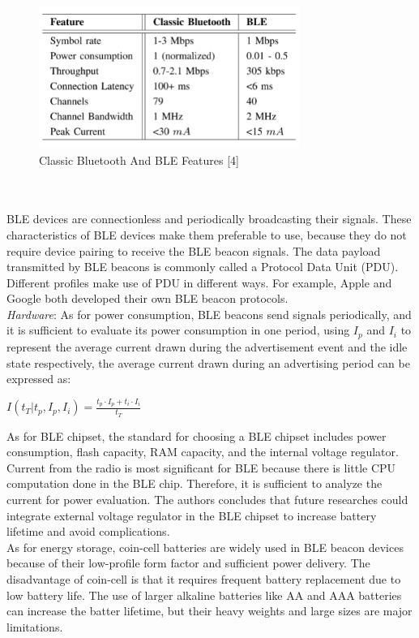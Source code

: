 \documentclass[conference]{IEEEtran}
\begin{document}
\begin{figure}[htbp]
\centerline{\includegraphics[width=8.5cm]{1.png}}
\caption{Classic Bluetooth And BLE Features [4]}
\label{fig}
\end{figure}\\ \\
\text{\quad} BLE devices are connectionless and periodically broadcasting their signals. These characteristics of BLE devices make them preferable to use, because they do not require device pairing to receive the BLE beacon signals. The data payload transmitted by BLE beacons is commonly called a Protocol Data Unit (PDU). Different profiles make use of PDU in different ways. For example, Apple and Google both developed their own BLE beacon protocols. \\
\text{\quad} \textit{Hardware}: As for power consumption, BLE beacons send signals periodically, and it is sufficient to evaluate its power consumption in one period, using $I_p$ and $I_i$ to represent the average current drawn during the advertisement event and the idle state respectively, the average current drawn during an advertising period can be expressed as: 
\begin{center}
$I(t_T|t_p, I_p, I_i) = \frac{t_p \cdot I_p+t_i \cdot I_i}{t_T}$
\end{center}
\text{\quad} As for BLE chipset, the standard for choosing a BLE chipset includes power consumption, flash capacity, RAM capacity, and the internal voltage regulator. Current from the radio is most significant for BLE because there is little CPU computation done in the BLE chip. Therefore, it is sufficient to analyze the current for power evaluation. The authors concludes that future researches could integrate external voltage regulator in the BLE chipset to increase battery lifetime and avoid complications.\\
\text{\quad} As for energy storage, coin-cell batteries are widely used in BLE beacon devices because of their low-profile form factor and sufficient power delivery. The disadvantage of coin-cell is that it requires frequent battery replacement due to low battery life. The use of larger alkaline batteries like AA and AAA batteries can increase the batter lifetime, but their heavy weights and large sizes are major limitations. \\ 
\end{document}
